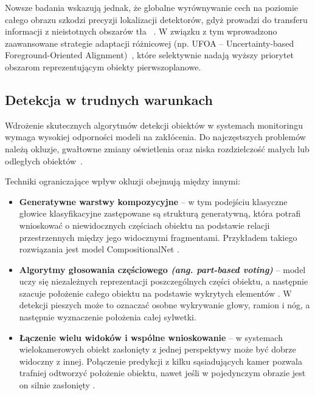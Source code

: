 Nowsze badania wskazują jednak, że globalne wyrównywanie cech na poziomie całego obrazu szkodzi
precyzji lokalizacji detektorów, gdyż prowadzi do transferu informacji z nieistotnych obszarów tła
~\cite{he2024}. W związku z tym wprowadzono zaawansowane strategie adaptacji różnicowej (np. UFOA –
Uncertainty-based Foreground-Oriented Alignment)~\cite{he2024}, które selektywnie nadają wyższy
priorytet obszarom reprezentującym obiekty pierwszoplanowe.

\subsection{Detekcja w trudnych warunkach}

Wdrożenie skutecznych algorytmów detekcji obiektów w systemach monitoringu wymaga wysokiej
odporności modeli na zakłócenia. Do najczęstszych problemów należą okluzje, gwałtowne zmiany
oświetlenia oraz niska rozdzielczość małych lub odległych obiektów~\cite{nikouei2025, cheng2026}.

Techniki ograniczające wpływ okluzji obejmują między innymi:
\begin{itemize}
  \item \textbf{Generatywne warstwy kompozycyjne} – w tym podejściu klasyczne głowice klasyfikacyjne zastępowane są strukturą generatywną, która potrafi wnioskować o niewidocznych częściach obiektu na podstawie relacji przestrzennych między jego widocznymi fragmentami. Przykładem takiego rozwiązania jest model CompositionalNet \cite{cheng2026}.
  \item \textbf{Algorytmy głosowania częściowego \textit{(ang. part-based voting)}} – model uczy się niezależnych reprezentacji poszczególnych części obiektu, a następnie szacuje położenie całego obiektu na podstawie wykrytych elementów \cite{cheng2026}. W detekcji pieszych może to oznaczać osobne wykrywanie głowy, ramion i nóg, a następnie wyznaczenie położenia całej sylwetki.
  \item \textbf{Łączenie wielu widoków i wspólne wnioskowanie} – w systemach wielokamerowych obiekt zasłonięty z jednej perspektywy może być dobrze widoczny z innej. Połączenie predykcji z kilku sąsiadujących kamer pozwala trafniej odtworzyć położenie obiektu, nawet jeśli w pojedynczym obrazie jest on silnie zasłonięty \cite{cheng2026}.
\end{itemize}


